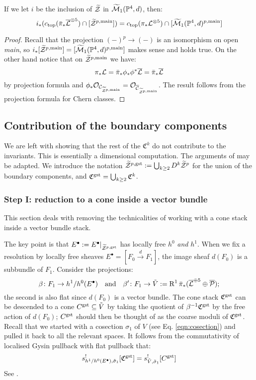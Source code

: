 \begin{lem}\label{lem:main-compo}
 If we let $i$ be the inclusion of $\widetilde{\mathcal Z}$ in $\widetilde{\mathcal{M}}_1(\mathbb P^4,d)$, then:
 \[
  i_*(c_{\rm{top}}(\bar{\pi}_*\overline{\mathcal{L}}^{\otimes 5})\cap[\widetilde{\mathcal Z}^{p,\rm{main}}])=c_{\rm{top}}({\pi}_*\mathcal L^{\otimes 5})\cap[\widetilde{\mathcal{M}}_1(\mathbb P^4,d)^{p,\rm{main}}]
 \]
\end{lem}
\begin{proof}
 Recall that the projection $(-)^p\to (-)$ is an isomorphism on open \emph{main}, so $i_*[\widetilde{\mathcal Z}^{p,\rm{main}}]=[\widetilde{\mathcal{M}}_1(\mathbb P^4,d)^{p,\rm{main}}]$ makes sense and holds true. On the other hand notice that on $\widetilde{\mathcal Z}^{p,\rm{main}}$ we have:
 \[
  \pi_*\mathcal L=\bar{\pi}_*\phi_*\phi^*\overline{\mathcal{L}}=\bar{\pi}_*\overline{\mathcal{L}}
 \]
by projection formula and $\phi_*\mathcal{O}_{\mathcal{C}_{\widetilde{\mathcal Z}^{p,\rm{main}}}}=\mathcal{O}_{\overline{\mathcal{C}}_{\widetilde{\mathcal Z}^{p,\rm{main}}}}$. The result follows from the projection formula for Chern classes.
\end{proof}

\subsection{Contribution of the boundary components} We are left with showing that the rest of the $\mathfrak C^k$ do not contribute to the invariants. This is essentially a dimensional computation. The arguments of \cite[\S\S6-8]{CLpfields} may be adapted. We introduce the notation $\widetilde{\mathcal Z}^{p,\rm{gst}}:=\bigcup_{k\geq 2} D^k\widetilde{\mathcal Z}^p$ for the union of the boundary components, and $\mathfrak C^{\rm{gst}}=\bigcup_{k\geq 2}\mathfrak C^k$.

\subsubsection{Step I: reduction to a cone inside a vector bundle}

This section deals with removing the technicalities of working with a cone stack inside a vector bundle stack.

The key point is that $E^{\bullet}:=E^{\bullet}\rvert_{\widetilde{\mathcal Z}^{p,\rm{gst}}}$ has locally free $h^0$ \emph{and} $h^1$. When we fix a resolution by locally free sheaves $E^{\bullet}=[F_0\xrightarrow{d} F_1]$, the image sheaf $d(F_0)$ is a subbundle of $F_1$. Consider the projections:
\[
 \beta\colon F_1\rightarrow h^1/h^0(E^{\bullet}) \quad \text{and} \quad \beta'\colon F_1\rightarrow \tilde{V}:=\operatorname{R}^1\bar{\pi}_*(\overline{\mathcal{L}}^{\oplus 5}\oplus\overline{\mathcal P});
\]
the second is also flat since $d(F_0)$ is a vector bundle. The cone stack $\mathfrak C^{\rm{gst}}$ can be descended to a cone $C^{\rm{gst}}\subseteq \tilde{V}$ by taking the quotient of $\beta^{-1}\mathfrak C^{\rm{gst}}$ by the free action of $d(F_0)$; $C^{\rm{gst}}$ should then be thought of as the coarse moduli of $\mathfrak C^{\rm{gst}}$. Recall that we started with a cosection $\sigma_1$ of $V$ (see Eq. \eqref{eqn:cosection}) and pulled it back to all the relevant spaces. 
It follows from the commutativity of localised Gysin pullback with flat pullback that:
\[
 s^!_{h^1/h^0(E^{\bullet}),\tilde\sigma_1}[\mathfrak C^{\rm{gst}}]= s^!_{\tilde V,\tilde\sigma_1}[C^{\rm{gst}}]
\]
See \cite[Proposition 6.3]{CLpfields}.



